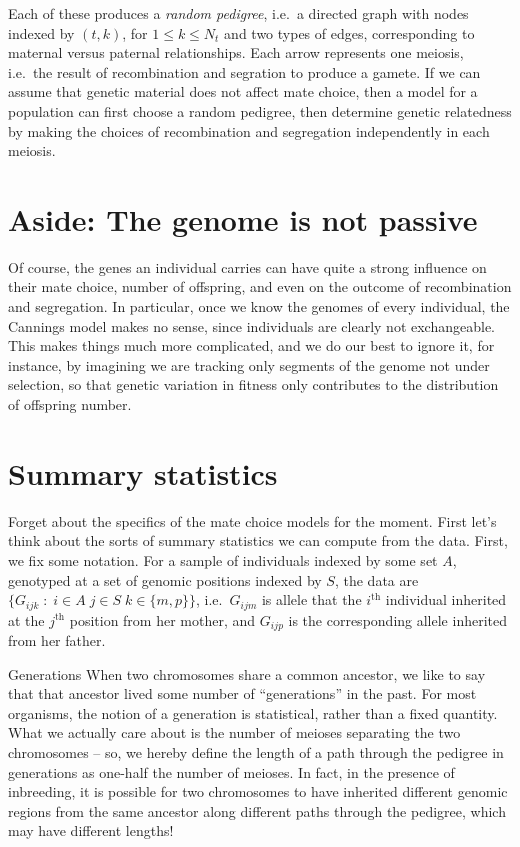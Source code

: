 Each of these produces a \emph{random pedigree}, 
i.e.\ a directed graph with nodes indexed by $(t,k)$, for $1 \le k \le N_t$
and two types of edges, corresponding to maternal versus paternal relationships.
Each arrow represents one meiosis, i.e.\ the result of recombination and segration to produce a gamete.
If we can assume that genetic material does not affect mate choice,
then a model for a population can first choose a random pedigree,
then determine genetic relatedness by making the choices of recombination and segregation
independently in each meiosis.



\section*{Aside: The genome is not passive}

Of course, the genes an individual carries can have quite a strong influence
on their mate choice, number of offspring, and even on the outcome of recombination and segregation.
In particular, once we know the genomes of every individual, the Cannings model makes no sense,
since individuals are clearly not exchangeable.
This makes things much more complicated,
and we do our best to ignore it,
for instance, by imagining we are tracking only segments of the genome not under selection,
so that genetic variation in fitness only contributes to the distribution of offspring number.



\section{Summary statistics}

Forget about the specifics of the mate choice models for the moment.
First let's think about the sorts of summary statistics we can compute from the data.
First, we fix some notation.
For a sample of individuals indexed by some set $A$,
genotyped at a set of genomic positions indexed by $S$,
the data are $\{G_{ijk} \; : \; i \in A \; j \in S \; k \in \{m,p\} \}$,
i.e.\ $G_{ijm}$ is allele that the $i^\mathrm{th}$ individual inherited at the $j^\mathrm{th}$ position from her mother,
and $G_{ijp}$ is the corresponding allele inherited from her father.


\begin{definition}{Generations}
  When two chromosomes share a common ancestor, we like to say that that ancestor lived some number of ``generations'' in the past.
  For most organisms, the notion of a generation is statistical, rather than a fixed quantity.
  What we actually care about is the number of meioses separating the two chromosomes --
  so, we hereby define the length of a path through the pedigree in generations as one-half the number of meioses.
  In fact, in the presence of inbreeding, it is possible for two chromosomes to have inherited different genomic regions
  from the same ancestor along different paths through the pedigree, which may have different lengths!
\end{definition}

